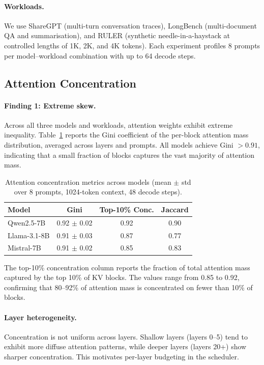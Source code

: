 \documentclass[acmsmall,nonacm,screen]{acmart}
\begin{document}
\paragraph{Workloads.}
We use ShareGPT (multi-turn conversation traces), LongBench (multi-document
QA and summarisation), and RULER (synthetic needle-in-a-haystack at
controlled lengths of 1K, 2K, and 4K tokens).  Each experiment profiles
8 prompts per model--workload combination with up to 64 decode steps.

\subsection{Attention Concentration}\label{sec:meas:hotset}

\paragraph{Finding 1: Extreme skew.}
Across all three models and workloads, attention weights exhibit extreme
inequality.  Table~\ref{tab:gini} reports the Gini coefficient of the
per-block attention mass distribution, averaged across layers and prompts.
All models achieve Gini $> 0.91$, indicating that a small fraction of blocks
captures the vast majority of attention mass.

\begin{table}[t]
\centering
\caption{Attention concentration metrics across models
(mean $\pm$ std over 8 prompts, 1024-token context, 48 decode steps).}
\label{tab:gini}
\begin{tabular}{lccc}
\toprule
\textbf{Model} & \textbf{Gini} & \textbf{Top-10\% Conc.} & \textbf{Jaccard} \\
\midrule
Qwen2.5-7B    & 0.92 $\pm$ 0.02 & 0.92 & 0.90 \\
Llama-3.1-8B  & 0.91 $\pm$ 0.03 & 0.87 & 0.77 \\
Mistral-7B    & 0.91 $\pm$ 0.02 & 0.85 & 0.83 \\
\bottomrule
\end{tabular}
\end{table}

The top-10\% concentration column reports the fraction of total attention
mass captured by the top 10\% of KV blocks.  The values range from 0.85
to 0.92, confirming that 80--92\% of attention mass is concentrated on
fewer than 10\% of blocks.

\paragraph{Layer heterogeneity.}
Concentration is not uniform across layers.  Shallow layers (layers 0--5)
tend to exhibit more diffuse attention patterns, while deeper layers
(layers 20+) show sharper concentration.  This motivates per-layer
budgeting in the scheduler.
\end{document}
